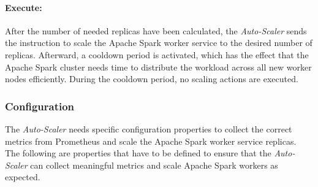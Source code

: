 \paragraph{Execute:}
After the number of needed replicas have been calculated, the \textit{Auto-Scaler} sends the instruction to scale the Apache Spark worker service to the desired number of replicas.
Afterward, a cooldown period is activated, which has the effect that the Apache Spark cluster needs time to distribute the workload across all new worker nodes efficiently. During the cooldown period, no scaling actions are executed.


\subsubsection{Configuration}
\label{subsubsec:05_am_auto-scaler_config}
The \textit{Auto-Scaler} needs specific configuration properties to collect the correct metrics from Prometheus and scale the Apache Spark worker service replicas. The following are properties that have to be defined to ensure that the \textit{Auto-Scaler} can collect meaningful metrics and scale Apache Spark workers as expected.

